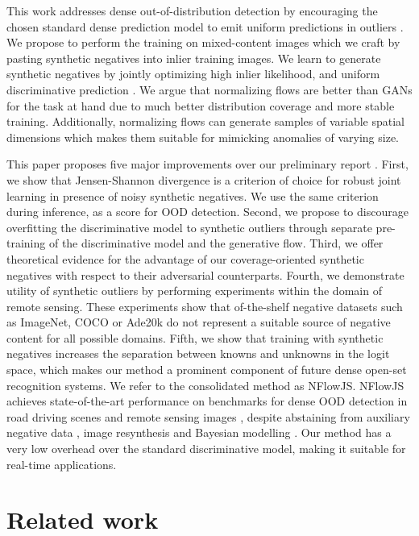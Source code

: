 \documentclass[lettersize,journal,hidelinks]{IEEEtran}
\begin{document}
This work addresses dense out-of-distribution detection by encouraging the chosen standard dense prediction model to emit uniform predictions in outliers \cite{lee18iclr}. 
We propose to perform the training on mixed-content images \cite{bevandic19gcpr} which we craft by pasting synthetic negatives
into inlier training images.
We learn to generate synthetic negatives 
by jointly optimizing high inlier likelihood, 
and uniform discriminative prediction \cite{lee18iclr}.
We argue that normalizing flows  are better than GANs for the task at hand due to much better distribution coverage and more stable training.
Additionally, normalizing flows can generate samples of variable spatial dimensions \cite{dinh17iclr} which makes them suitable for mimicking anomalies of varying size. 


This paper proposes five major improvements over our preliminary report \cite{grcic21visapp}.
First, we show that Jensen-Shannon divergence is 
a criterion of choice for robust joint learning 
in presence of noisy synthetic negatives.
We use the same criterion during inference,
as a score for OOD detection.
Second, we propose to discourage overfitting the discriminative model to synthetic outliers through separate pre-training of the discriminative model and the generative flow.
Third, we offer theoretical evidence for the advantage of our coverage-oriented synthetic negatives with respect to their adversarial counterparts.
Fourth, we demonstrate utility of synthetic outliers by performing experiments within the domain of remote sensing.
These experiments show that of-the-shelf negative datasets such as ImageNet, COCO or Ade20k do not represent a suitable source of negative content
for all possible domains.
Fifth, we show that training with synthetic negatives increases the separation between knowns and unknowns in the logit space, which makes our method a prominent component of future dense open-set recognition systems. 
We refer to the consolidated method as NFlowJS. 
NFlowJS achieves state-of-the-art performance on benchmarks for dense OOD detection in road driving scenes\cite{blum21ijcv,chan21arxiv} and remote sensing images \cite{carvalho22rs}, despite abstaining from auxiliary negative data \cite{bevandic19gcpr}, image resynthesis \cite{lis19iccv,biase21cvpr} and Bayesian modelling \cite{kendall17nips}.
Our method has a very low overhead over the standard discriminative model, making it suitable for real-time applications.

\section{Related work}
\end{document}
